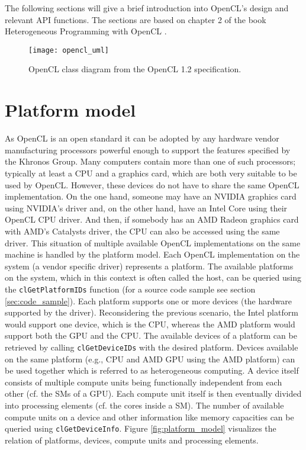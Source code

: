 The following sections will give a brief introduction into OpenCL's design and relevant API functions. The sections are based on chapter 2 of the book Heterogeneous Programming with OpenCL \cite[p.15-31]{opencl_book}.

\begin{figure}[h]
\centering
\texttt{[image: opencl\_uml]}
\caption{OpenCL class diagram from the OpenCL 1.2 specification. \cite{opencl_spec}}
\label{fig:opencl_uml}
\end{figure}

\section{Platform model}
As OpenCL is an open standard it can be adopted by any hardware vendor manufacturing processors powerful enough to support the features specified by the Khronos Group. Many computers contain more than one of such processors; typically at least a CPU and a graphics card, which are both very suitable to be used by OpenCL. However, these devices do not have to share the same OpenCL implementation. On the one hand, someone may have an NVIDIA graphics card using NVIDIA's driver and, on the other hand, have an Intel Core using their OpenCL CPU driver. And then, if somebody has an AMD Radeon graphics card with AMD's Catalysts driver, the CPU can also be accessed using the same driver.
This situation of multiple available OpenCL implementations on the same machine is handled by the platform model. Each OpenCL implementation on the system (a vendor specific driver) represents a platform. The available platforms on the system, which in this context is often called the host, can be queried using the \lstinline!clGetPlatformIDs! function (for a source code sample see section \ref{sec:code_sample}).
Each platform supports one or more devices (the hardware supported by the driver). Reconsidering the previous scenario, the Intel platform would support one device, which is the CPU, whereas the AMD platform would support both the GPU and the CPU. The available devices of a platform can be retrieved by calling \lstinline!clGetDeviceIDs! with the desired platform. Devices available on the same platform (e.g., CPU and AMD GPU using the AMD platform) can be used together which is referred to as heterogeneous computing. 
A device itself consists of multiple compute units being functionally independent from each other (cf. the SMs of a GPU). Each compute unit itself is then eventually divided into processing elements (cf. the cores inside a SM). The number of available compute units on a device and other information like memory capacities can be queried using \lstinline!clGetDeviceInfo!.
Figure \ref{fig:platform_model} visualizes the relation of platforms, devices, compute units and processing elements. \cite[pp.19]{opencl_book}

